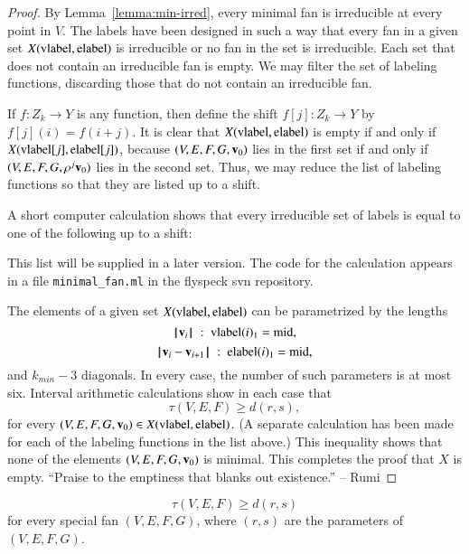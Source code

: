 \begin{proof}
By Lemma~\ref{lemma:min-irred}, every minimal fan is irreducible at every point in $V$.
The labels have been designed in such a way that every fan in a given set
$X({\operatorname{vlabel}},{\operatorname{elabel}})$ is irreducible or no fan in the set is irreducible.
Each set that does not contain an irreducible fan is empty.  We may filter the
set of labeling functions, discarding those that do not contain an irreducible fan.

If $f:Z_k\to Y$ is any function, then define the shift $f[j]:Z_k\to Y$ by
$f[j](i) = f(i+j)$.  It is clear that $X({\operatorname{vlabel}},{\operatorname{elabel}})$ is empty
if and only if $X({\operatorname{vlabel}}[j],{\operatorname{elabel}}[j])$, because $(V,E,F,G,{\mathbf v}_0)$ lies
in the first set if and only if $(V,E,F,G,\rho^j{\mathbf v}_0)$ lies in the second set.  Thus,
we may reduce the list of labeling functions so that they are listed up to a shift.

A short computer calculation shows that every irreducible set of labels is equal
to one of the following up to a shift:

\begin{note}%
This list will be supplied in a later version.  The code for the calculation appears in a file \verb!minimal_fan.ml! in the flyspeck svn repository.
\end{note}

The elements of a given set $X({\operatorname{vlabel}},{\operatorname{elabel}})$ can be parametrized
by the lengths 
$${{\hskip0.1em|\hskip-0.15em|\hskip0.1em}{\mathbf v}_i{\hskip0.1em|\hskip-0.15em|\hskip0.1em}} \ :\  {\operatorname{vlabel}}(i)_1 = {\operatorname{mid}},$$
$${\hskip0.1em|\hskip-0.15em|\hskip0.1em}{\mathbf v}_i - {\mathbf v}_{i+1}{\hskip0.1em|\hskip-0.15em|\hskip0.1em} \ :\  {\operatorname{elabel}}(i)_1 = {\operatorname{mid}},$$
and $k_{min}-3$ diagonals.  In every case, the number of such parameters is
at most six.    Interval arithmetic calculations %
show in each case that
$$
\tau(V,E,F) \ge d(r,s),
$$
for every $(V,E,F,G,{\mathbf v}_0)\in X({\operatorname{vlabel}},{\operatorname{elabel}})$.  (A separate calculation
has been made \cite[cc:tau]{hales:2009:nonlinear} for each of the labeling functions in the list above.)
This inequality shows that none of the elements $(V,E,F,G,{\mathbf v}_0)$ is minimal.
This completes the proof that $X$ is empty.
 ``Praise to the emptiness that blanks out existence.'' -- Rumi %
\end{proof}

\begin{corollary}\label{lemma:empty-d}
$$
\tau(V,E,F) \ge d (r,s)
$$
for every special fan $(V,E,F,G)$, where $(r,s)$ are the parameters of $(V,E,F,G)$.
\end{corollary}

